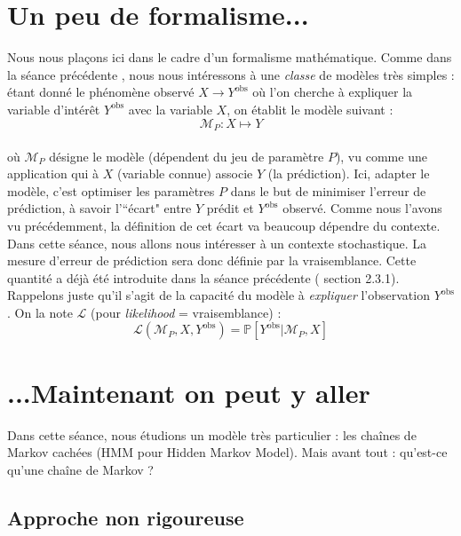 \documentclass{article}
\begin{document}
\section{Un peu de formalisme...}
Nous nous plaçons ici dans le cadre d'un formalisme mathématique. Comme dans la séance précédente \cite{1}, nous nous intéressons à une \textit{classe} de modèles très simples : étant donné le phénomène observé $X\rightarrow Y^{\text{obs}}$ où l'on cherche à expliquer la variable d'intérêt $Y^{\text{obs}}$ avec la variable $X$, on établit le modèle suivant :
\[\mathcal{M}_P:X \mapsto Y\]
\\
où $\mathcal{M}_P$ désigne le modèle (dépendent du jeu de paramètre $P$), vu comme une application qui à $X$ (variable connue) associe $Y$ (la prédiction). Ici, adapter le modèle, c'est optimiser les paramètres $P$ dans le but de minimiser l'erreur de prédiction, à savoir l'``écart" entre $Y$ prédit et $Y^{\text{obs}}$ observé. Comme nous l'avons vu précédemment, la définition de cet écart va beaucoup dépendre du contexte. Dans cette séance, nous allons nous intéresser à un contexte stochastique. La mesure d'erreur de prédiction sera donc définie par la vraisemblance. Cette quantité a déjà été introduite dans la séance précédente (\cite{1} section 2.3.1). Rappelons juste qu'il s'agit de la capacité du modèle à \textit{expliquer} l'observation $Y^{\text{obs}}$. On la note $\mathcal{L}$ (pour \textit{likelihood} = vraisemblance) :
\[\mathcal{L}(\mathcal{M}_P,X,Y^{\text{obs}}) = \mathbb{P}[Y^{\text{obs}}\vert \mathcal{M}_P,X]\]

\section{ ...Maintenant on peut y aller}

Dans cette séance, nous étudions un modèle très particulier : les cha\^ines de Markov cachées (HMM pour Hidden Markov Model). Mais avant tout : qu'est-ce qu'une chaîne de Markov ?

\subsection{Approche non rigoureuse}
\end{document}
